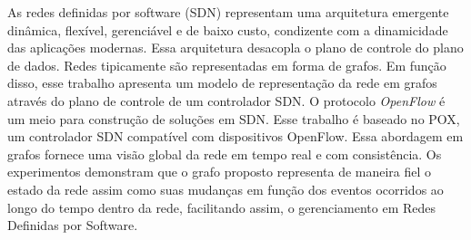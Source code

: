 
As redes definidas por software (SDN) representam 
uma arquitetura emergente dinâmica, 
flexível, gerenciável e de baixo custo,
condizente com a dinamicidade das aplicações modernas. 
Essa arquitetura desacopla o plano de controle do plano de dados. 
Redes tipicamente são representadas em forma de grafos.
Em função disso, esse trabalho apresenta
um modelo de representação da rede em grafos através do 
plano de controle de um controlador SDN. 
O protocolo \emph{OpenFlow} é um meio para construção de soluções em SDN.
Esse trabalho é baseado no POX, um controlador SDN compatível 
com dispositivos OpenFlow.
Essa abordagem em grafos fornece uma visão global da rede em tempo 
real e com consistência.
Os experimentos demonstram que o grafo proposto representa de 
maneira fiel o estado da rede assim como suas mudanças em função 
dos eventos ocorridos ao longo do tempo dentro da rede, 
facilitando assim, o gerenciamento em Redes Definidas por Software.



